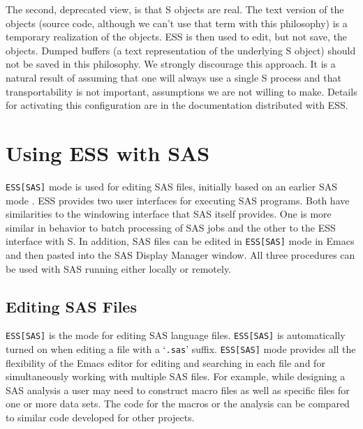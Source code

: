 \documentclass{article}
\newcommand{\stexttt}[1]{{\small\texttt{#1}}}
\newcommand{\ssf}[1]{{\small\sf{#1}}}
\newcommand{\file}[1]{`\stexttt{#1}'}
\begin{document}
The second, deprecated view, is that S objects are real.  The text
version of the objects (source code, although we can't use that term
with this philosophy) is a temporary realization of the objects.  ESS
is then used to edit, but not save, the objects.
Dumped buffers (a text representation of the underlying S object)
should not be saved in this philosophy.
We strongly discourage this approach.  It is a natural result of
assuming that one will always use a single S process and that
transportability is not important, assumptions we are not willing to
make.  Details for activating this configuration are in the
documentation distributed with ESS.


\section{Using ESS with SAS}
\label{sec:SAS}

\stexttt{ESS[SAS]} mode is used for editing SAS files, initially based
on an earlier SAS mode \cite{SASMODE}.  ESS provides two user
interfaces for executing SAS programs.  Both have similarities to the
windowing interface that SAS itself provides.  One is more similar in
behavior to batch processing of SAS jobs and the other to the ESS
interface with S.  In addition, SAS files can be edited in
\stexttt{ESS[SAS]} mode in Emacs and then pasted into the SAS Display
Manager \ssf{Program Editor} window.  All three procedures can be used
with SAS running either locally or remotely.

\subsection{Editing SAS Files}
\label{sec:SAS:edit}

\stexttt{ESS[SAS]} is the mode for editing SAS language files.
\stexttt{ESS[SAS]} is automatically turned on when editing a file with
a \file{.sas} suffix.  \stexttt{ESS[SAS]} mode provides all the
flexibility of the Emacs editor for editing and searching in each file
and for simultaneously working with multiple SAS files.  For example,
while designing a SAS analysis a user may need to construct macro
files as well as specific files for one or more data sets.  The code
for the macros or the analysis can be compared to similar code
developed for other projects.
\end{document}
